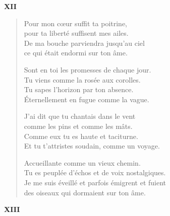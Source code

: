 \documentclass[11pt,a4paper]{book}
\begin{document}
\begin{center} \textbf{XII} \end{center}

\bigskip

\begin{verse}
  Pour mon cœur suffit ta poitrine, \\
  pour ta liberté suffisent mes ailes. \\
  De ma bouche parviendra jusqu'au ciel \\
  ce qui était endormi sur ton âme.

  Sont en toi les promesses de chaque jour. \\
  Tu viens comme la rosée aux corolles. \\
  Tu sapes l'horizon par ton absence. \\
  Éternellement en fugue comme la vague.

  J'ai dit que tu chantais dans le vent \\
  comme les pins et comme les mâts. \\
  Comme eux tu es haute et taciturne. \\
  Et tu t'attristes soudain, comme un voyage.

  Accueillante comme un vieux chemin. \\
  Tu es peuplée d'échos et de voix nostalgiques. \\
  Je me suis éveillé et parfois émigrent et fuient \\
  des oiseaux qui dormaient sur ton âme.
\end{verse}

\newpage


\begin{center} \textbf{XIII} \end{center}

\bigskip
\end{document}
